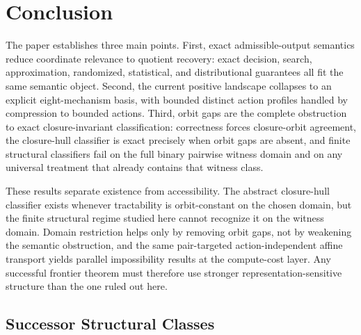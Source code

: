 \section{Conclusion}

The paper establishes three main points. First, exact admissible-output semantics reduce coordinate relevance to quotient recovery: exact decision, search, approximation, randomized, statistical, and distributional guarantees all fit the same semantic object. Second, the current positive landscape collapses to an explicit eight-mechanism basis, with bounded distinct action profiles handled by compression to bounded actions. Third, orbit gaps are the complete obstruction to exact closure-invariant classification: correctness forces closure-orbit agreement, the closure-hull classifier is exact precisely when orbit gaps are absent, and finite structural classifiers fail on the full binary pairwise witness domain and on any universal treatment that already contains that witness class.

These results separate existence from accessibility. The abstract closure-hull classifier exists whenever tractability is orbit-constant on the chosen domain, but the finite structural regime studied here cannot recognize it on the witness domain. Domain restriction helps only by removing orbit gaps, not by weakening the semantic obstruction, and the same pair-targeted action-independent affine transport yields parallel impossibility results at the compute-cost layer. Any successful frontier theorem must therefore use stronger representation-sensitive structure than the one ruled out here.

\subsection{Successor Structural Classes}

